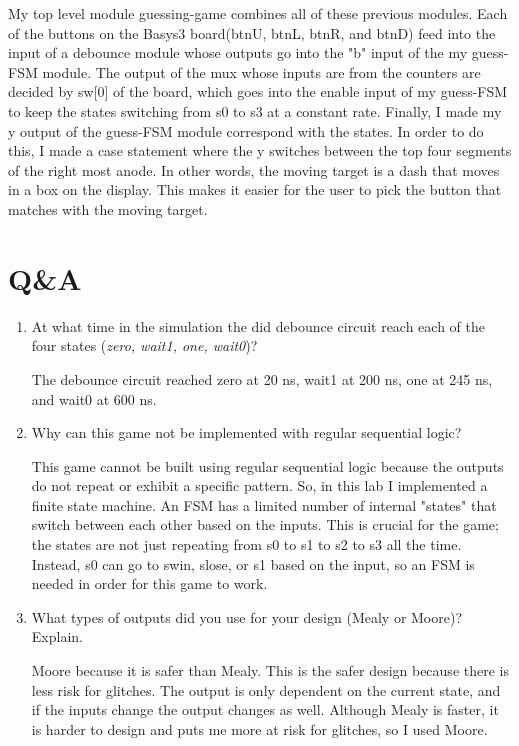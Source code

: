 \documentclass[11pt]{article}
\begin{document}
My top level module guessing-game combines all of these previous modules. Each of the buttons on the Basys3 board(btnU, btnL, btnR, and btnD) feed into the input of a debounce module whose outputs go into the "b" input of the my guess-FSM module. The output of the mux whose inputs are from the counters are decided by sw[0] of the board, which goes into the enable input of my guess-FSM to keep the states switching from s0 to s3 at a constant rate. Finally, I made my y output of the guess-FSM module correspond with the states. In order to do this, I made a case statement where the y switches between the top four segments of the right most anode. In other words, the moving target is a dash that moves in a box on the display. This makes it easier for the user to pick the button that matches with the moving target. 


\section*{Q\&A}

\begin{enumerate}
	\item At what time in the simulation the did debounce circuit reach each of the four states (\verb||\textit{zero, wait1, one, wait0})?
	
		The debounce circuit reached zero at 20 ns, wait1 at 200 ns, one at 245 ns, and wait0 at 600 ns.

	\item Why can this game not be implemented with regular sequential logic?
	
		This game cannot be built using regular sequential logic because the outputs do not repeat or exhibit a specific pattern. So, in this lab I implemented a finite state machine. An FSM has a limited number of internal "states" that switch between each other based on the inputs. This is crucial for the game; the states are not just repeating from s0 to s1 to s2 to s3 all the time. Instead, s0 can go to swin, slose, or s1 based on the input, so an FSM is needed in order for this game to work.

	\item What types of outputs did you use for your design (Mealy or Moore)? Explain.
	
		Moore because it is safer than Mealy. This is the safer design because there is less risk for glitches. The output is only dependent on the current state, and if the inputs change the output changes as well. Although Mealy is faster, it is harder to design and puts me more at risk for glitches, so I used Moore.

\end{enumerate}
\end{document}
